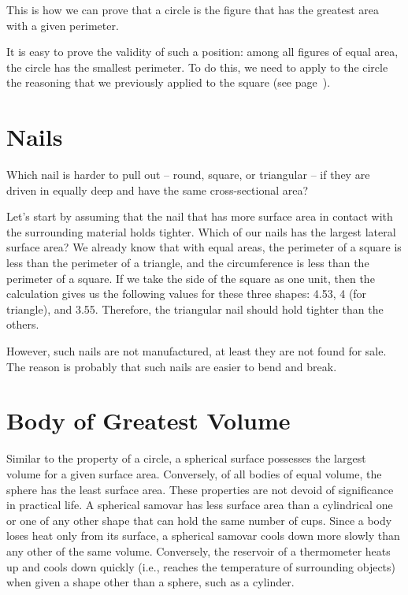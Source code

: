 This is how we can prove that a circle is the figure that has the greatest area with a given perimeter.

It is easy to prove the validity of such a position: among all figures of equal area, the circle has the smallest perimeter. To do this, we need to apply to the circle the reasoning that we previously applied to the square (see page~\pageref{sec-12.4}).

\section{Nails}
\label{sec-12.7}

\ques Which nail is harder to pull out -- round, square, or triangular -- if they are driven in equally deep and have the same cross-sectional area?

\ans Let's start by assuming that the nail that has more surface area in contact with the surrounding material holds tighter. Which of our nails has the largest lateral surface area? We already know that with equal areas, the perimeter of a square is less than the perimeter of a triangle, and the circumference is less than the perimeter of a square. If we take the side of the square as one unit, then the calculation gives us the following values for these three shapes: 4.53, 4 (for triangle), and 3.55. Therefore, the triangular nail should hold tighter than the others.

However, such nails are not manufactured, at least they are not found for sale. The reason is probably that such nails are easier to bend and break.


\section{Body of Greatest Volume}
\label{sec-12.8}

Similar to the property of a circle, a spherical surface possesses the largest volume for a given surface area. Conversely, of all bodies of equal volume, the sphere has the least surface area. These properties are not devoid of significance in practical life. A spherical samovar has less surface area than a cylindrical one or one of any other shape that can hold the same number of cups. Since a body loses heat only from its surface, a spherical samovar cools down more slowly than any other of the same volume. Conversely, the reservoir of a thermometer heats up and cools down quickly (i.e., reaches the temperature of surrounding objects) when given a shape other than a sphere, such as a cylinder.

